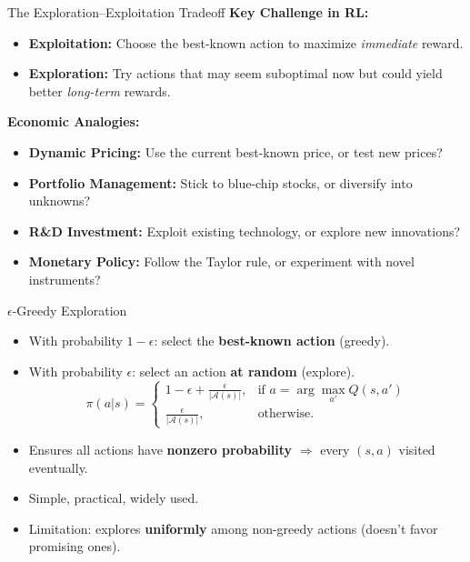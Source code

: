 \documentclass[10pt,english,aspectratio=169]{beamer}
\begin{document}
\begin{frame}{The Exploration--Exploitation Tradeoff}
    \textbf{Key Challenge in RL:}
    \begin{itemize}
        \item \textbf{Exploitation:} Choose the best-known action to maximize \emph{immediate} reward.
        \item \textbf{Exploration:} Try actions that may seem suboptimal now but could yield better \emph{long-term} rewards.
    \end{itemize}

    \vspace{0.3cm}
    \textbf{Economic Analogies:}
    \begin{itemize}
        \item \textbf{Dynamic Pricing:} Use the current best-known price, or test new prices?
        \item \textbf{Portfolio Management:} Stick to blue-chip stocks, or diversify into unknowns?
        \item \textbf{R\&D Investment:} Exploit existing technology, or explore new innovations?
        \item \textbf{Monetary Policy:} Follow the Taylor rule, or experiment with novel instruments?
    \end{itemize}
\end{frame}

\begin{frame}{$\epsilon$-Greedy Exploration}
  \begin{itemize}
    \item With probability $1 - \epsilon$: select the \textbf{best-known action} (greedy).
    \item With probability $\epsilon$: select an action \textbf{at random} (explore).
    \[
        \pi(a|s) =
        \begin{cases}
            1 - \epsilon + \frac{\epsilon}{|\mathcal{A}(s)|}, & \text{if } a = \arg\max_{a'} Q(s,a') \\[4pt]
            \frac{\epsilon}{|\mathcal{A}(s)|}, & \text{otherwise}.
        \end{cases}
    \]
    \item Ensures all actions have \textbf{nonzero probability} $\Rightarrow$ every $(s,a)$ visited eventually.
    \item Simple, practical, widely used.
    \item Limitation: explores \textbf{uniformly} among non-greedy actions (doesn't favor promising ones).
  \end{itemize}
\end{frame}
\end{document}
